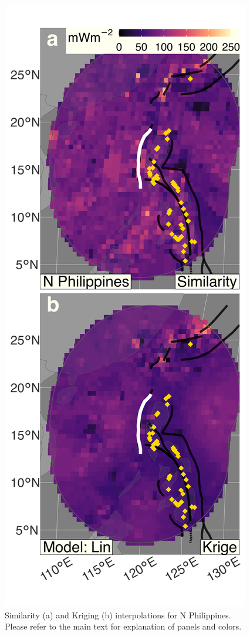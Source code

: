 \begin{figure}[htbp]

{\centering \includegraphics[width=1\linewidth,]{assets/figs/chpt3/NPhilippinesDiffComp} 

}

\caption[Similarityand Kriging interpolations for N Philippines]{Similarity (a) and Kriging (b) interpolations for N Philippines. Please refer to the main text for explanation of panels and colors.}\label{fig:nPhilippinesDiff}
\end{figure}

